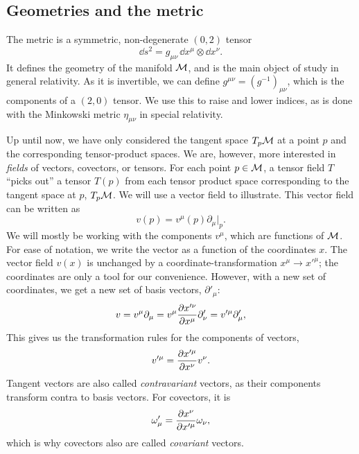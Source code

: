 \subsection{Geometries and the metric}

The metric is a symmetric, non-degenerate $(0, 2)$ tensor
%
\begin{equation}
    \dd s^2 = g_{\mu \nu} \, \dd x^\mu \otimes \dd x^\nu.
\end{equation}
%
It defines the geometry of the manifold $\mathcal{M}$, and is the main object of study in general relativity.
As it is invertible, we can define $g^{\mu \nu} = (g^{-1})_{\mu \nu}$, which is the components of a $(2, 0)$ tensor.
We use this to raise and lower indices, as is done with the Minkowski metric $\eta_{\mu \nu}$ in special relativity.

Up until now, we have only considered the tangent space $T_p \mathcal{M}$ at a point $p$ and the corresponding tensor-product spaces.
We are, however, more interested in \emph{fields} of vectors, covectors, or tensors.
For each point $p \in \mathcal{M}$, a tensor field $T$ ``picks out'' a tensor $T(p)$ from each tensor product space corresponding to the tangent space at $p$, $T_p \mathcal{M}$.
We will use a vector field to illustrate.
This vector field can be written as
%
\begin{equation}
    v(p) = v^\mu(p) \partial_\mu |_p. 
\end{equation}
%
We will mostly be working with the components $v^\mu$, which are functions of $\mathcal{M}$.
For ease of notation, we write the vector as a function of the coordinates $x$.
The vector field $v(x)$ is unchanged by a coordinate-transformation $x^\mu \rightarrow {x'}^\mu$; the coordinates are only a tool for our convenience.
However, with a new set of coordinates, we get a new set of basis vectors, $\partial'_\mu$:
%
\begin{equation}
    v = v^\mu \partial_\mu = v^\mu \pdv{x'^\nu}{x^\mu} \partial'_\nu
    = v'^\mu \partial_\mu',
\end{equation}
%
This gives us the transformation rules for the components of vectors,
%
\begin{equation}
    v'^\mu = \pdv{x'^\mu}{x^\nu} v^\nu.
\end{equation}
%
Tangent vectors are also called \emph{contravariant} vectors, as their components transform contra to basis vectors.
For covectors, it is
%
\begin{equation}
    \omega'_\mu = \pdv{x^\nu}{x'^\mu} \omega_\nu,
\end{equation}
%
which is why covectors also are called \emph{covariant} vectors.

